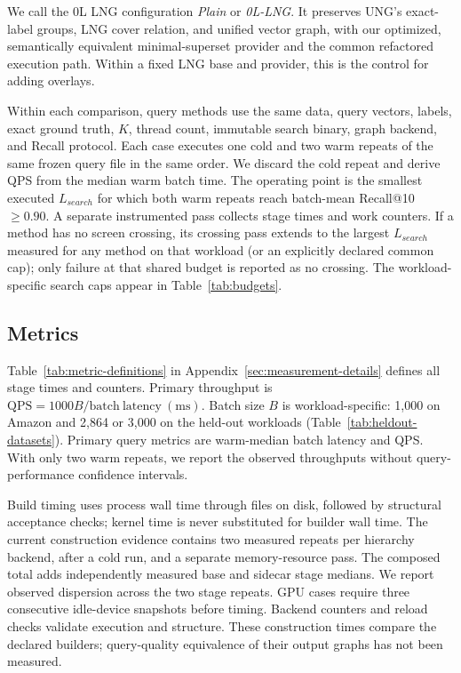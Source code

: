 We call the 0L LNG configuration \emph{Plain} or \emph{0L-LNG}.  It
preserves UNG's exact-label groups, LNG cover relation, and unified vector
graph, with our optimized, semantically equivalent minimal-superset
provider and the common refactored execution path.  Within a fixed LNG base and provider, this is the control for adding overlays.

Within each comparison, query methods use the same data, query vectors, labels, exact ground truth,
$K$, thread count, immutable search binary, graph backend, and Recall protocol.
Each case executes one cold and two warm repeats of the same frozen query
file in the same order. We discard the cold repeat and derive QPS from the
median warm batch time. The operating point is the smallest executed
$L_{search}$ for which both warm repeats reach batch-mean Recall@10 $\ge0.90$.
A separate instrumented pass collects stage times and work counters.
If a method has no screen crossing, its
crossing pass extends to the largest $L_{search}$ measured for any method on
that workload (or an explicitly declared common cap); only failure at that
shared budget is reported as no crossing.
The workload-specific search caps appear in Table~\ref{tab:budgets}.

\subsection{Metrics}
Table~\ref{tab:metric-definitions} in Appendix~\ref{sec:measurement-details}
defines all stage times and counters. Primary throughput is
$\mathrm{QPS}=1000B/\mathrm{batch\ latency\ (ms)}$.  Batch size $B$ is workload-specific: 1,000 on Amazon and
2,864 or 3,000 on the held-out workloads (Table~\ref{tab:heldout-datasets}).  Primary query metrics are
warm-median batch latency and QPS. With only two warm repeats, we report the observed throughputs
without query-performance confidence intervals.

Build timing uses process wall time through files on disk, followed by
structural acceptance checks; kernel time is never substituted for builder
wall time. The current construction evidence contains two measured repeats
per hierarchy backend, after a cold run, and a separate memory-resource pass.
The composed total adds independently measured base and sidecar stage medians.
We report observed dispersion across the two stage repeats.
GPU cases require three consecutive idle-device snapshots before timing. Backend counters and reload checks validate execution and structure.
These construction times compare the declared builders; query-quality
equivalence of their output graphs has not been measured.

